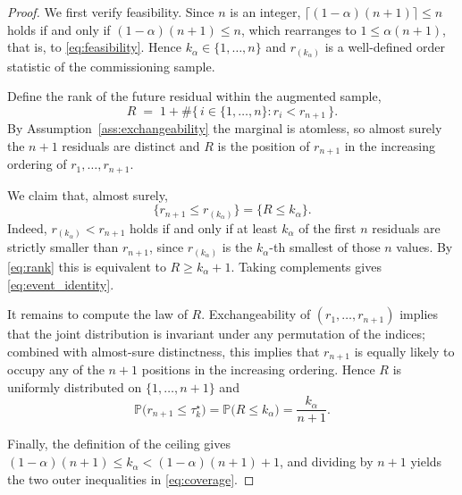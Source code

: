 \documentclass[a4paper]{cas-sc}
\newcommand{\residual}{\ensuremath{r}}
\newcommand{\Prob}{\ensuremath{\mathbb{P}}}
\begin{document}
\begin{proof}
We first verify feasibility. Since \(n\) is an integer,
\(\lceil (1-\alpha)(n+1)\rceil \le n\) holds if and only if
\((1-\alpha)(n+1)\le n\), which rearranges to \(1\le\alpha(n+1)\), that is,
to \eqref{eq:feasibility}. Hence \(k_\alpha\in\{1,\ldots,n\}\) and
\(\residual_{(k_\alpha)}\) is a well-defined order statistic of the
commissioning sample.

Define the rank of the future residual within the augmented sample,
\begin{equation}
R \;=\; 1 + \#\bigl\{\,i\in\{1,\ldots,n\} : \residual_i < \residual_{n+1}\,\bigr\}.
\label{eq:rank}
\end{equation}
By Assumption~\ref{ass:exchangeability} the marginal is atomless, so almost
surely the \(n+1\) residuals are distinct and \(R\) is the position of
\(\residual_{n+1}\) in the increasing ordering of
\(\residual_1,\ldots,\residual_{n+1}\).

We claim that, almost surely,
\begin{equation}
\bigl\{\residual_{n+1}\le\residual_{(k_\alpha)}\bigr\}
=
\bigl\{R\le k_\alpha\bigr\}.
\label{eq:event_identity}
\end{equation}
Indeed, \(\residual_{(k_\alpha)}<\residual_{n+1}\) holds if and only if at
least \(k_\alpha\) of the first \(n\) residuals are strictly smaller than
\(\residual_{n+1}\), since \(\residual_{(k_\alpha)}\) is the
\(k_\alpha\)-th smallest of those \(n\) values. By \eqref{eq:rank} this is
equivalent to \(R\ge k_\alpha+1\). Taking complements gives
\eqref{eq:event_identity}.

It remains to compute the law of \(R\). Exchangeability of
\((\residual_1,\ldots,\residual_{n+1})\) implies that the joint
distribution is invariant under any permutation of the indices; combined
with almost-sure distinctness, this implies that \(\residual_{n+1}\) is
equally likely to occupy any of the \(n+1\) positions in the increasing
ordering. Hence \(R\) is uniformly distributed on \(\{1,\ldots,n+1\}\) and
\begin{equation}
\Prob\bigl(\residual_{n+1}\le\tau_k^\star\bigr)
= \Prob\bigl(R\le k_\alpha\bigr)
= \frac{k_\alpha}{n+1}.
\label{eq:exact_coverage}
\end{equation}

Finally, the definition of the ceiling gives
\((1-\alpha)(n+1) \le k_\alpha < (1-\alpha)(n+1)+1\), and dividing by
\(n+1\) yields the two outer inequalities in \eqref{eq:coverage}.
\end{proof}
\end{document}
